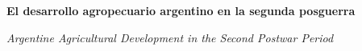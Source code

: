 \documentclass{article}
\renewcommand{\normalsize}{\fontsize{10pt}{13pt}\selectfont}
\newcommand{\articulotipo}{}
\newcommand{\articulotitulo}{}
\newcommand{\articulosubtitulo}{}
\newcommand{\articulotitulotrans}{}
\newcommand{\articuloautores}{}
\newcommand{\articulodoi}{}
\newcommand{\articuloidiomaxml}{es}
\newcommand{\articulorevista}{}
\newcommand{\articuloissne}{}
\newcommand{\articulovolumen}{}
\newcommand{\articulonumero}{}
\newcommand{\articulofecha}{}
\newcommand{\articulopagina}{0}
\begin{document}

\renewcommand{\articuloidiomaxml}{es}
\renewcommand{\articulotitulo}{El desarrollo agropecuario argentino en la segunda posguerra}
\renewcommand{\articulosubtitulo}{Otro artículo sobre agro en la segunda posguerra}
\renewcommand{\articuloautores}{Marcelo Rougier, Alberto Alejandro Moyano}
\renewcommand{\articulodoi}{10.56503/H-Industria/n.37(19)/3473}
\renewcommand{\articulotipo}{ARTÍCULO DE INVESTIGACIÓN}
\renewcommand{\articulorevista}{H-industria}
\renewcommand{\articuloissne}{1851-703X}
\renewcommand{\articulovolumen}{01}
\renewcommand{\articulonumero}{01}
\renewcommand{\articulofecha}{ 2026}
\renewcommand{\articulopagina}{23}

\setcounter{page}{23}
\thispagestyle{firstpage}

\noindent\begin{minipage}[t]{\dimexpr\textwidth+\marginparsep+\marginparwidth\relax}%
{\sffamily\bfseries\Large\articulotitulo\par}%
\end{minipage}\par
\vspace{3mm}%
\renewcommand{\articulotitulotrans}{Argentine Agricultural Development in the Second Postwar Period}
\noindent\begin{minipage}[t]{\dimexpr\textwidth+\marginparsep+\marginparwidth\relax}%
{\sffamily\itshape\normalsize\articulotitulotrans\par}%
\end{minipage}\par
\vspace{4mm}%
\end{document}

